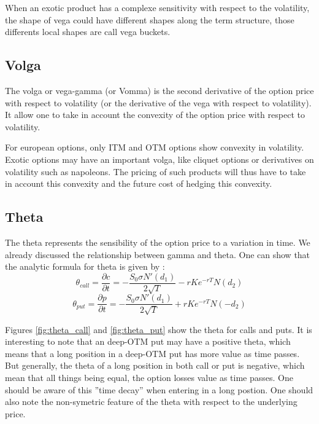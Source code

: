 \documentclass[hidelinks]{article}
\begin{document}
    When an exotic product has a complexe sensitivity with respect to the volatility, the shape of vega could have different shapes along the term structure, those differents local shapes are call vega buckets.
    
    \newpage
    \subsection{Volga}
    The volga or vega-gamma (or Vomma) is the second derivative of the option price with respect to volatility (or the derivative of the vega with respect to volatility). It allow one to take in account the convexity of the option price with respect to volatility.
    
    For european options, only ITM and OTM options show convexity in volatility. Exotic options may have an important volga, like cliquet options or derivatives on volatility such as napoleons. The pricing of such products will thus have to take in account this convexity and the future cost of hedging this convexity.
    
    \newpage
    \subsection{Theta}
    
    The theta represents the sensibility of the option price to a variation in time. We already discussed the relationship between gamma and theta. One can show that the analytic formula for theta is given by :
    $$\theta_{call} = \frac{\partial c}{\partial t} = -\frac{S_0 \sigma N'(d_1)}{2\sqrt{T}} - rKe^{-rT}N(d_2)$$
    $$\theta_{put} = \frac{\partial p}{\partial t} = -\frac{S_0 \sigma N'(d_1)}{2\sqrt{T}} + rKe^{-rT}N(-d_2)$$
    
    Figures \ref{fig:theta_call} and \ref{fig:theta_put} show the theta for calls and puts. It is interesting to note that an deep-OTM put may have a positive theta, which means that a long position in a deep-OTM put has more value as time passes. But generally, the theta of a long position in both call or put is negative, which mean that all things being equal, the option losses value as time passes. One should be aware of this ''time decay'' when entering in a long postion. One should also note the non-symetric feature of the theta with respect to the underlying price.
    
\end{document}

